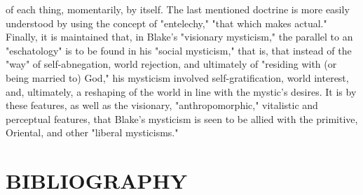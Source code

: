 of each thing, momentarily, by itself. The last mentioned doctrine is more easily understood by using the concept of "entelechy,"
"that which makes actual." Finally, it is maintained that, in Blake's  "visionary mysticism," the parallel to an "eschatology" is
to be found in his "social mysticism," that is, that instead of the "way" of self-abnegation, world rejection, and ultimately of
"residing with (or being married to) God," his mysticism involved self-gratification, world interest, and, ultimately, a
reshaping of the world in line with the mystic's desires. It is by these features, as well as the visionary, "anthropomorphic,"
vitalistic and perceptual features, that Blake's mysticism is seen to be allied with the primitive, Oriental, and other "liberal mysticisms."\par

\newpage

\section*{\centering BIBLIOGRAPHY}

{}

